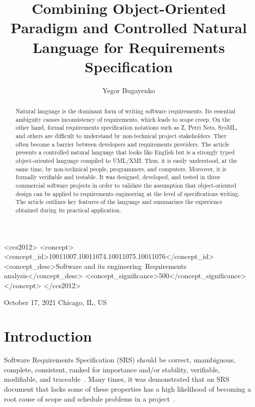 \documentclass[sigplan,10pt]{acmart}
\newcommand{\nospell}[1]{#1}
\begin{document}
\title{Combining Object-Oriented Paradigm and Controlled Natural Language for Requirements Specification}
\author{Yegor Bugayenko}{}{}
\begin{CCSXML}
<ccs2012>
<concept>
<concept_id>10011007.10011074.10011075.10011076</concept_id>
<concept_desc>Software and its engineering~Requirements analysis</concept_desc>
<concept_significance>500</concept_significance>
</concept>
</ccs2012>
\end{CCSXML}
  {October 17, 2021}
  {Chicago, IL, US}

\begin{abstract} Natural language is the dominant form of writing software requirements.
Its essential ambiguity causes inconsistency of requirements,
which leads to scope creep. On the other hand, formal requirements
specification notations such as Z, \nospell{Petri Nets}, SysML, and others are
difficult to understand by non-technical project stakeholders. They often
become a barrier between developers and requirements providers. The article
presents a controlled natural language that looks like English but
is a strongly typed object-oriented language compiled to
UML/XMI. Thus, it is easily understood, at the same time, by non-technical
people, programmers, and computers. Moreover, it is formally verifiable and
testable. It was designed, developed, and tested in three commercial
software projects in order to validate the assumption that object-oriented
design can be applied to requirements engineering at the level of
specifications writing. The article outlines key features of the language and summarizes
the experience obtained during its practical application. \end{abstract}
\maketitle

\section{Introduction}
\label{sec:intro}

Software Requirements Specification (SRS) should be correct, unambiguous,
complete, consistent, ranked for importance and/or stability, verifiable,
modifiable, and traceable~\citep{ieee830}. Many times, it was demonstrated that an SRS
document that lacks some of these properties has a high likelihood of
becoming a root cause of scope and schedule problems in a
project~\citep{wiegers03,ears09,chen09}.
\end{document}
